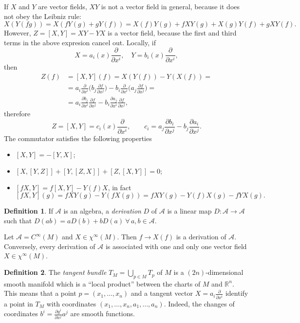 \documentclass[a4paper,12pt]{book}
\theoremstyle{definition}
\newtheorem{definition}{Definition}
\theoremstyle{remark}
\begin{document}
If $X$ and $Y$ are vector fields, $XY$ is not a vector field in general, because it does not obey the Leibniz rule:
\[X(Y(fg))=X(fY(g)+gY(f))=X(f)Y(g)+fXY(g)+X(g)Y(f)+gXY(f).\]
However, $Z=[X,Y]=XY-YX$ is a vector field, because the first and third terms in the above expresion cancel out. Locally, if
\[X=a_i(x)\frac{\partial}{\partial x^i},\quad Y=b_i(x)\frac{\partial}{\partial x^i},\]
then
\[\begin{split}
Z(f)&=[X,Y](f)=X(Y(f))-Y(X(f))=\\
&=a_i\frac{\partial}{\partial x^i}\biggl(b_j\frac{\partial f}{\partial x^j}\biggr)-b_i\frac{\partial}{\partial x^i}\biggl(a_j\frac{\partial f}{\partial x^j}\biggr)=\\
&=a_i\frac{\partial b_j}{\partial x^i}\frac{\partial f}{\partial x^j}-b_i\frac{\partial a_j}{\partial x^i}\frac{\partial f}{\partial x^j},
\end{split}\]
therefore
\[Z=[X,Y]=c_i(x)\frac{\partial}{\partial x^i},\qquad c_i=a_j\frac{\partial b_i}{\partial x^j}-b_j\frac{\partial a_i}{\partial x^j}.\]
The commutator satisfies the following properties
\begin{itemize}
\item $[X,Y]=-[Y,X]$;
\item $[X,[Y,Z]]+[Y,[Z,X]]+[Z,[X,Y]]=0$;
\item $[fX,Y]=f[X,Y]-Y(f)X$, in fact
\[[fX,Y](g)=fXY(g)-Y(fX(g))=fXY(g)-Y(f)X(g)-fYX(g).\]
\end{itemize}
\begin{definition}
If $\mathcal A$ is an algebra, a \emph{derivation} $D$ of $\mathcal A$ is a linear map $D\colon \mathcal A\to \mathcal A$ such that $D(ab)=aD(b)+bD(a)\ \forall\,a,b\in\mathcal A$.
\end{definition}

Let $\mathcal A=C^\infty(M)$ and $X\in\chi^\infty(M)$. Then $f\to X(f)$ is a derivation of $\mathcal A$. Conversely, every derivation of $\mathcal A$ is associated with one and only one vector field $X\in\chi^\infty(M)$.

\begin{definition}
The \emph{tangent bundle} $T_M=\bigcup_{p\in M}T_p$ of $M$ is a $(2n)$-dimensional smooth manifold which is a ``local product'' between the charts of $M$ and $\mathbb R^n$. This means that a point $p=(x_1,\ldots,x_n)$ and a tangent vector $X=a_i\frac{\partial}{\partial x^i}$ identify a point in $T_M$ with coordinates $(x_1,\ldots,x_n,a_1,\ldots,a_n)$. Indeed, the changes of coordinates $b^i=\frac{\partial y^i}{\partial x^j}a^j$ are smooth functions.
\end{definition}
\end{document}
